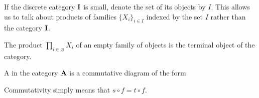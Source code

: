 \begin{note}\label{note:small_categorical_product}
  If the discrete category \( \operatorname{\mathbf{I}} \) is small, denote the set of its objects by \( I \). This allows us to talk about products of families \( \{ X_i \}_{i \in I} \) indexed by the set \( I \) rather than the category \( \operatorname{\mathbf{I}} \).
\end{note}

\begin{note}\label{note:empty_categorical_product}
  The product \( \prod_{i \in \varnothing} X_i \) of an empty family of objects is the terminal object of the category.
\end{note}

\begin{definition}\label{def:categorical_fork}\cite[112]{Leinster2014}
  A  in the category \( \operatorname{\mathbf{A}} \) is a commutative diagram of the form
  \begin{Center}
  \end{Center}

  Commutativity simply means that \( s \circ f = t \circ f \).
\end{definition}

